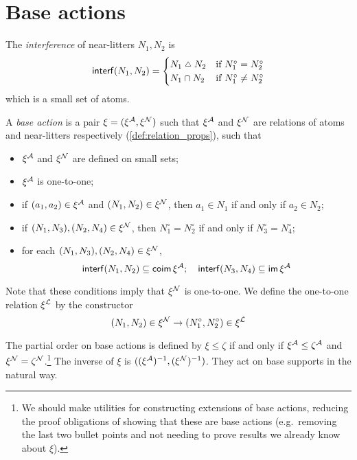 \section{Base actions}
\begin{definition}
  \label{def:Interference}
  \leanok
  The \emph{interference} of near-litters \( N_1, N_2 \) is
  \[ \interf(N_1, N_2) = \begin{cases}
    N_1 \symmdiff N_2 & \text{if } N_1^\circ = N_2^\circ \\
    N_1 \cap N_2 & \text{if } N_1^\circ \neq N_2^\circ
  \end{cases} \]
  which is a small set of atoms.
\end{definition}
\begin{definition}
  \label{def:BaseAction}
  \leanok
  A \emph{base action} is a pair \( \xi = (\xi^{\mathcal A}, \xi^{\mathcal N}) \) such that \( \xi^{\mathcal A} \) and \( \xi^{\mathcal N} \) are relations of atoms and near-litters respectively (\cref{def:relation_props}), such that
  \begin{itemize}
    \item \( \xi^{\mathcal A} \) and \( \xi^{\mathcal N} \) are defined on small sets;
    \item \( \xi^{\mathcal A} \) is one-to-one;
    \item if \( (a_1, a_2) \in \xi^{\mathcal A} \) and \( (N_1, N_2) \in \xi^{\mathcal N} \), then \( a_1 \in N_1 \) if and only if \( a_2 \in N_2 \);
    \item if \( (N_1, N_3), (N_2, N_4) \in \xi^{\mathcal N} \), then \( N_1^\circ = N_2^\circ \) if and only if \( N_3^\circ = N_4^\circ \);
    \item for each \( (N_1, N_3), (N_2, N_4) \in \xi^{\mathcal N} \),
    \[ \operatorname{\mathsf{interf}}(N_1, N_2) \subseteq \operatorname{\mathsf{coim}} \xi^{\mathcal A};\quad \operatorname{\mathsf{interf}}(N_3, N_4) \subseteq \operatorname{\mathsf{im}} \xi^{\mathcal A} \]
  \end{itemize}
  Note that these conditions imply that \( \xi^{\mathcal N} \) is one-to-one.
  We define the one-to-one relation \( \xi^{\mathcal L} \) by the constructor
  \[ (N_1, N_2) \in \xi^{\mathcal N} \to (N_1^\circ, N_2^\circ) \in \xi^{\mathcal L} \]

  The partial order on base actions is defined by \( \xi \leq \zeta \) if and only if \( \xi^{\mathcal A} \leq \zeta^{\mathcal A} \) and \( \xi^{\mathcal N} = \zeta^{\mathcal N} \).\footnote{We should make utilities for constructing extensions of base actions, reducing the proof obligations of showing that these are base actions (e.g.\ removing the last two bullet points and not needing to prove results we already know about \( \xi \)).}
  The inverse of \( \xi \) is \( ((\xi^{\mathcal A})^{-1}, (\xi^{\mathcal N})^{-1}) \).
  They act on base supports in the natural way.
\end{definition}
